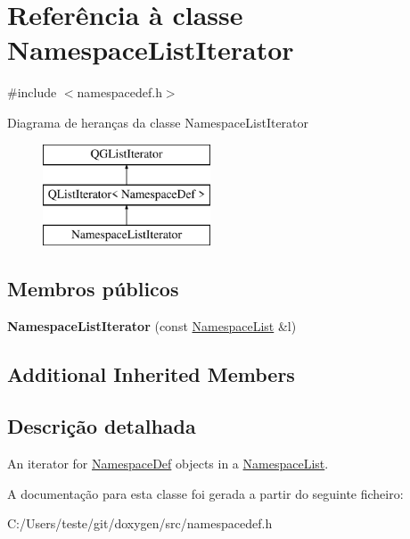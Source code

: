 \hypertarget{class_namespace_list_iterator}{\section{Referência à classe Namespace\-List\-Iterator}
\label{class_namespace_list_iterator}
}


{\ttfamily \#include $<$namespacedef.\-h$>$}

Diagrama de heranças da classe Namespace\-List\-Iterator\begin{figure}[H]
\begin{center}
\leavevmode
\includegraphics[height=3.000000cm]{class_namespace_list_iterator}
\end{center}
\end{figure}
\subsection*{Membros públicos}
\begin{DoxyCompactItemize}
\item 
\hypertarget{class_namespace_list_iterator_a991298fcb321286c8692abbbd06f3ec4}{{\bfseries Namespace\-List\-Iterator} (const \hyperlink{class_namespace_list}{Namespace\-List} \&l)}\label{class_namespace_list_iterator_a991298fcb321286c8692abbbd06f3ec4}

\end{DoxyCompactItemize}
\subsection*{Additional Inherited Members}


\subsection{Descrição detalhada}
An iterator for \hyperlink{class_namespace_def}{Namespace\-Def} objects in a \hyperlink{class_namespace_list}{Namespace\-List}. 

A documentação para esta classe foi gerada a partir do seguinte ficheiro\-:\begin{DoxyCompactItemize}
\item 
C\-:/\-Users/teste/git/doxygen/src/namespacedef.\-h\end{DoxyCompactItemize}
